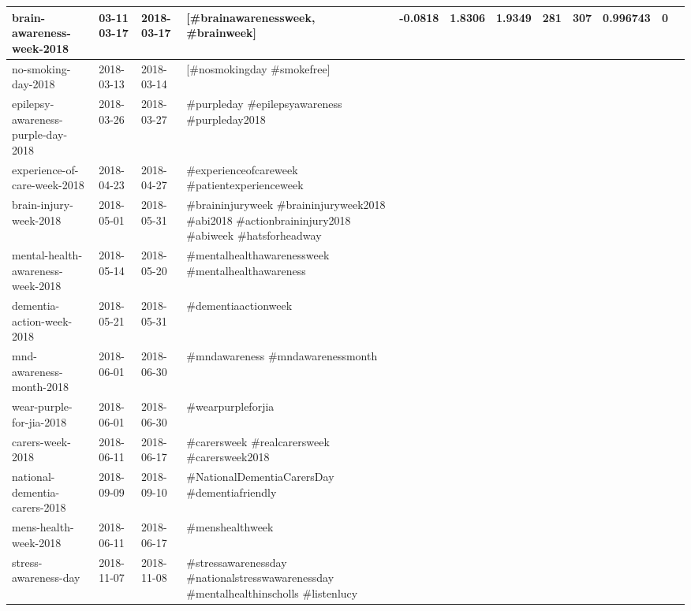 \documentclass[runningheads]{llncs}
\begin{document}
\begin{table}
{\begin{tabularx}{\textwidth}{|X|X|X|X|X|X|X|X|X|X|X|X|}
			\hline 
			\rule[-1ex]{0pt}{2.5ex}  brain-awareness-week-2018	& 03-11	03-17	& 2018-03-17 &	[\#brainawarenessweek, \#brainweek]& -0.0818	 &  1.8306	& 1.9349	& 281	& 307	& 0.996743 & 0 & \\
			\hline 
						\rule[-1ex]{0pt}{2.5ex}  no-smoking-day-2018 & 2018-03-13  & 2018-03-14 & [\#nosmokingday \#smokefree]    & & & & & \\ 
			\hline 
			\rule[-1ex]{0pt}{2.5ex}  epilepsy-awareness-purple-day-2018 & 2018-03-26  & 2018-03-27 & \#purpleday \#epilepsyawareness \#purpleday2018    & & & & & \\ 
			\hline 
			\rule[-1ex]{0pt}{2.5ex}  experience-of-care-week-2018 & 2018-04-23  & 2018-04-27 & \#experienceofcareweek \#patientexperienceweek    & & & & & \\ 
			\hline 
			\rule[-1ex]{0pt}{2.5ex}  brain-injury-week-2018               & 2018-05-01  & 2018-05-31 & \#braininjuryweek \#braininjuryweek2018 \#abi2018 \#actionbraininjury2018 \#abiweek \#hatsforheadway    & & & & & \\ 
			\hline 
			\rule[-1ex]{0pt}{2.5ex}  mental-health-awareness-week-2018    & 2018-05-14  & 2018-05-20 & \#mentalhealthawarenessweek \#mentalhealthawareness      & & & & & \\ 
			\hline 
			\rule[-1ex]{0pt}{2.5ex}  dementia-action-week-2018  & 2018-05-21  & 2018-05-31 & \#dementiaactionweek      & & & & & \\ 
			\hline 
			\rule[-1ex]{0pt}{2.5ex}  mnd-awareness-month-2018 & 2018-06-01  & 2018-06-30 & \#mndawareness \#mndawarenessmonth         & & & & & \\ 
			\hline
			\rule[-1ex]{0pt}{2.5ex}   wear-purple-for-jia-2018             & 2018-06-01  & 2018-06-30 & \#wearpurpleforjia         & & & & & \\ 
			\hline 
			\rule[-1ex]{0pt}{2.5ex}   carers-week-2018                     & 2018-06-11  & 2018-06-17 & \#carersweek \#realcarersweek \#carersweek2018        & & & & & \\ 
			\hline 
			\rule[-1ex]{0pt}{2.5ex}  national-dementia-carers-2018        & 2018-09-09  & 2018-09-10 & \#NationalDementiaCarersDay \#dementiafriendly           & & & & & \\ 
			\hline 
			\rule[-1ex]{0pt}{2.5ex}  mens-health-week-2018                & 2018-06-11  & 2018-06-17 & \#menshealthweek           & & & & & \\ 
			\hline 
			\rule[-1ex]{0pt}{2.5ex}  stress-awareness-day                 & 2018-11-07  & 2018-11-08 & \#stressawarenessday \#nationalstresswawarenessday \#mentalhealthinscholls \#listenlucy             & & & & & \\ 

\end{tabularx}}
\end{table}
\end{document}
